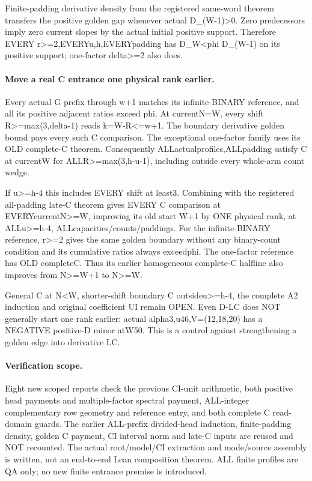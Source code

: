 Finite-padding derivative density from the registered same-word theorem
transfers the positive golden gap whenever actual D_(W-1)>0.
Zero predecessors imply zero current slopes by the actual initial positive
support. Therefore EVERY r>=2,EVERYu,h,EVERYpadding has
D_W<phi D_(W-1) on its positive support; one-factor delta>=2 also does.

\paragraph{Move a real C entrance one physical rank earlier.}
Every actual G prefix through w+1 matches its infinite-BINARY reference,
and all its positive adjacent ratios exceed phi. At currentN=W,
every shift R>=max(3,delta-1) reads k=W-R<=w+1.
The boundary derivative golden bound pays every such C comparison.
The exceptional one-factor family uses its OLD complete-C theorem.
Consequently ALLactualprofiles,ALLpadding satisfy C at currentW for
ALLR>=max(3,h-u-1), including outside every whole-arm count wedge.

If u>=h-4 this includes EVERY shift at least3. Combining with the
registered all-padding late-C theorem gives EVERY C comparison at
EVERYcurrentN>=W, improving its old start W+1 by ONE physical rank,
at ALLu>=h-4, ALLcapacities/counts/paddings.
For the infinite-BINARY reference, r>=2 gives the same golden boundary
without any binary-count condition and its cumulative ratios always
exceedphi. The one-factor reference has OLD completeC. Thus its earlier
homogeneous complete-C halfline also improves from N>=W+1 to N>=W.

General C at N<W, shorter-shift boundary C outsideu>=h-4,
the complete A2 induction and original coefficient UI remain OPEN.
Even D-LC does NOT generally start one rank earlier: actual
alpha3,u46,V=(12,18,20) has a NEGATIVE positive-D minor atW50.
This is a control against strengthening a golden edge into derivative LC.

\paragraph{Verification scope.}
Eight new scoped reports check the previous CI-unit arithmetic,
both positive head payments and multiple-factor spectral payment,
ALL-integer complementary row geometry and reference entry,
and both complete C read-domain guards. The earlier ALL-prefix
divided-head induction, finite-padding density, golden C payment,
CI interval norm and late-C inputs are reused and NOT recounted.
The actual root/model/CI extraction and mode/source assembly is
written, not an end-to-end Lean composition theorem. ALL finite
profiles are QA only; no new finite entrance premise is introduced.
